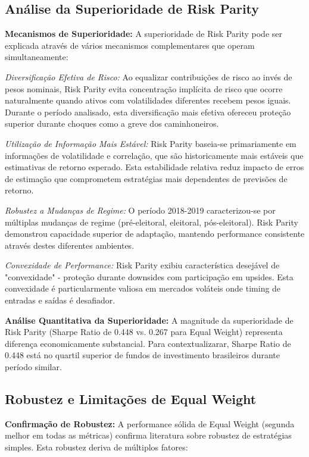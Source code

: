 \subsection{Análise da Superioridade de Risk Parity}

\textbf{Mecanismos de Superioridade:} A superioridade de Risk Parity pode ser explicada através de vários mecanismos complementares que operam simultaneamente:

\textit{Diversificação Efetiva de Risco:} Ao equalizar contribuições de risco ao invés de pesos nominais, Risk Parity evita concentração implícita de risco que ocorre naturalmente quando ativos com volatilidades diferentes recebem pesos iguais. Durante o período analisado, esta diversificação mais efetiva ofereceu proteção superior durante choques como a greve dos caminhoneiros.

\textit{Utilização de Informação Mais Estável:} Risk Parity baseia-se primariamente em informações de volatilidade e correlação, que são historicamente mais estáveis que estimativas de retorno esperado. Esta estabilidade relativa reduz impacto de erros de estimação que comprometem estratégias mais dependentes de previsões de retorno.

\textit{Robustez a Mudanças de Regime:} O período 2018-2019 caracterizou-se por múltiplas mudanças de regime (pré-eleitoral, eleitoral, pós-eleitoral). Risk Parity demonstrou capacidade superior de adaptação, mantendo performance consistente através destes diferentes ambientes.

\textit{Convexidade de Performance:} Risk Parity exibiu característica desejável de "convexidade" - proteção durante downsides com participação em upsides. Esta convexidade é particularmente valiosa em mercados voláteis onde timing de entradas e saídas é desafiador.

\textbf{Análise Quantitativa da Superioridade:} A magnitude da superioridade de Risk Parity (Sharpe Ratio de 0.448 vs. 0.267 para Equal Weight) representa diferença economicamente substancial. Para contextualizarar, Sharpe Ratio de 0.448 está no quartil superior de fundos de investimento brasileiros durante período similar.

\subsection{Robustez e Limitações de Equal Weight}

\textbf{Confirmação de Robustez:} A performance sólida de Equal Weight (segunda melhor em todas as métricas) confirma literatura sobre robustez de estratégias simples. Esta robustez deriva de múltiplos fatores:

